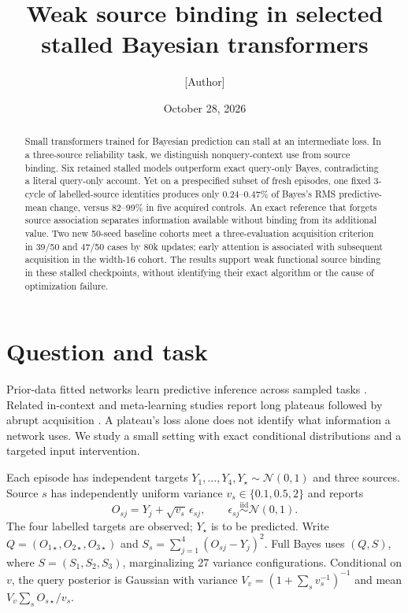 \documentclass[10pt]{article}
\title{\vspace{-1.1em}Weak source binding in selected stalled Bayesian transformers}
\author{[Author]}
\date{October 28, 2026}
\begin{document}
\maketitle
\vspace{-1.2em}
\begin{abstract}
Small transformers trained for Bayesian prediction can stall at an intermediate
loss. In a three-source reliability task, we distinguish nonquery-context use
from source binding. Six retained stalled models outperform
exact query-only Bayes, contradicting a literal query-only account. Yet on a
prespecified subset of fresh episodes, one fixed 3-cycle of labelled-source identities
produces only 0.24--0.47\% of
Bayes's RMS predictive-mean change, versus 82--99\% in five acquired controls.
An exact reference that forgets source association separates information available
without binding from its additional value. Two new 50-seed baseline cohorts
meet a three-evaluation acquisition criterion in 39/50 and 47/50 cases by 80k
updates; early attention is associated with subsequent acquisition in the
width-16 cohort. The results support weak functional
source binding in these stalled checkpoints, without identifying their exact
algorithm or the cause of optimization failure.
\end{abstract}

\section{Question and task}
Prior-data fitted networks learn predictive inference across sampled tasks
\citep{muller2021}. Related in-context and meta-learning studies report long
plateaus followed by abrupt acquisition \citep{kirsch2022,reddy2023,nguyen2024}.
A plateau's loss alone does not identify what information a network uses.
We study a small setting with exact conditional distributions and a targeted
input intervention.

Each episode has independent targets
$Y_1,\ldots,Y_4,Y_\star\sim\mathcal N(0,1)$ and three sources. Source $s$ has
independently uniform variance $v_s\in\{0.1,0.5,2\}$ and reports
\begin{equation}
 O_{sj}=Y_j+\sqrt{v_s}\,\epsilon_{sj},\qquad
 \epsilon_{sj}\stackrel{\mathrm{iid}}\sim\mathcal N(0,1).
\end{equation}
The four labelled targets are observed; $Y_\star$ is to be predicted.
Write $Q=(O_{1\star},O_{2\star},O_{3\star})$ and
$S_s=\sum_{j=1}^4(O_{sj}-Y_j)^2$. Full Bayes uses $(Q,S)$,
where $S=(S_1,S_2,S_3)$, marginalizing 27 variance configurations. Conditional
on $v$, the query posterior is Gaussian with variance
$V_v=(1+\sum_s v_s^{-1})^{-1}$ and mean $V_v\sum_s O_{s\star}/v_s$.
\end{document}
